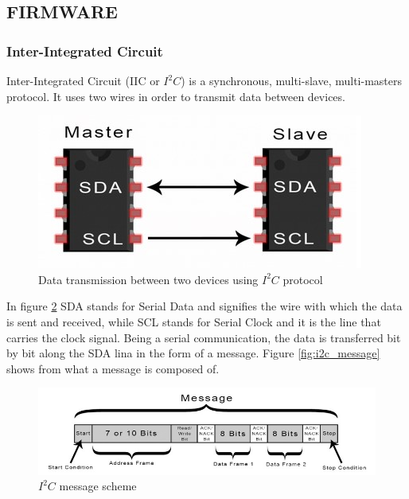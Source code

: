 \documentclass[runningheads,a4paper,12pt]{report}
\begin{document}
\subsection{FIRMWARE}
\subsubsection{Inter-Integrated Circuit}
\label{section:i2c}
Inter-Integrated Circuit (IIC or $I^{2}C$) is a synchronous, multi-slave, multi-masters protocol. It uses two wires in order to transmit data between devices.

\begin{figure}[h]
	\centering

  	\includegraphics[width=.8\linewidth]{./images/1_i2c}\hfill

    \caption{Data transmission between two devices using $I^{2}C$ protocol}  
    \label{fig:i2c}
\end{figure} 

In figure \ref{fig:i2c} SDA stands for Serial Data and signifies the wire with which the data is sent and received, while SCL stands for Serial Clock and it is the line that carries the clock signal. Being a serial communication, the data is transferred bit by bit along the SDA lina in the form of a message. Figure \ref{fig:i2c_message} shows from what a message is composed of.

\begin{figure}[h]
	\centering

  	\includegraphics[width=\linewidth]{./images/1_i2c_message}\hfill

    \caption{$I^{2}C$ message scheme}  
    \label{fig:i2c}
\end{figure}
\end{document}
